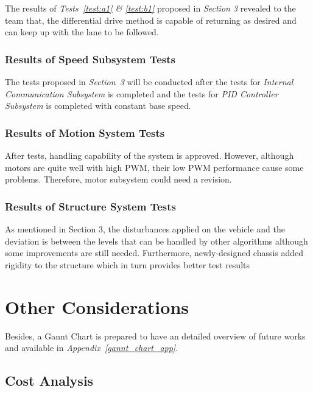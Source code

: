 \documentclass[a4paper,12pt]{article}
\begin{document}
The results of \textit{Tests~\ref{test:a1} \& \ref{test:b1}} proposed in \textit{Section 3} revealed to the team that, the differential drive method is capable of returning as desired and can keep up with the lane to be followed.



\subsubsection*{Results of Speed Subsystem Tests}


The tests proposed in \textit{Section~3} will be conducted after the tests for \textit{Internal Communication Subsystem} is completed and the tests for \textit{PID Controller Subsystem} is completed with constant base speed. 



\subsubsection*{Results of Motion System Tests}

After tests, handling capability of the system is approved. However, although motors are quite well with high PWM, their low PWM performance cause some problems. Therefore, motor subsystem could need a revision.


\subsubsection*{Results of Structure System Tests}

As mentioned in Section 3, the disturbances applied on the vehicle and the deviation is between the levels that can be handled by other algorithms although some improvements are still needed. Furthermore, newly-designed chassis added rigidity to the structure which in turn provides better test results





\section{Other Considerations}


Besides, a Gannt Chart is prepared to have an detailed overview of future works and available in \textit{Appendix~\ref{gannt_chart_app}}.





\subsection{Cost Analysis}
\end{document}
